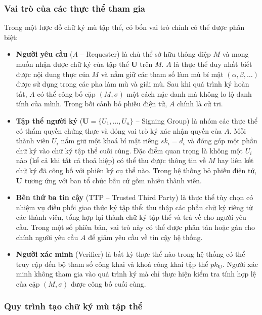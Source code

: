 \subsubsection{Vai trò của các thực thể tham gia}

Trong một lược đồ chữ ký mù tập thể, có bốn vai trò chính có thể được phân biệt:

\begin{itemize}
    \item \textbf{Người yêu cầu} ($A$ -- Requester) là chủ thể sở hữu thông điệp $M$ và mong muốn nhận được chữ ký của tập thể $\mathbf{U}$ trên $M$. $A$ là thực thể duy nhất biết được nội dung thực của $M$ và nắm giữ các tham số làm mù bí mật $(\alpha, \beta, \ldots)$ được sử dụng trong các pha làm mù và giải mù. Sau khi quá trình ký hoàn tất, $A$ có thể công bố cặp $(M, \sigma)$ một cách nặc danh mà không lo lộ danh tính của mình. Trong bối cảnh bỏ phiếu điện tử, $A$ chính là cử tri.

    \item \textbf{Tập thể người ký} ($\mathbf{U} = \{U_1, \ldots, U_n\}$ -- Signing Group) là nhóm các thực thể có thẩm quyền chứng thực và đóng vai trò ký xác nhận quyền của $A$. Mỗi thành viên $U_i$ nắm giữ một khoá bí mật riêng $sk_i = d_i$ và đóng góp một phần chữ ký vào chữ ký tập thể cuối cùng. Đặc điểm quan trọng là không một $U_i$ nào (kể cả khi tất cả thoả hiệp) có thể thu được thông tin về $M$ hay liên kết chữ ký đã công bố với phiên ký cụ thể nào. Trong hệ thống bỏ phiếu điện tử, $\mathbf{U}$ tương ứng với ban tổ chức bầu cử gồm nhiều thành viên.

    \item \textbf{Bên thứ ba tin cậy} (TTP -- Trusted Third Party) là thực thể tùy chọn có nhiệm vụ điều phối giao thức ký tập thể: thu thập các phần chữ ký riêng từ các thành viên, tổng hợp lại thành chữ ký tập thể và trả về cho người yêu cầu. Trong một số phiên bản, vai trò này có thể được phân tán hoặc gán cho chính người yêu cầu $A$ để giảm yêu cầu về tin cậy hệ thống.

    \item \textbf{Người xác minh} (Verifier) là bất kỳ thực thể nào trong hệ thống có thể truy cập đến bộ tham số công khai và khoá công khai tập thể $pk_{\mathbf{U}}$. Người xác minh không tham gia vào quá trình ký mà chỉ thực hiện kiểm tra tính hợp lệ của cặp $(M, \sigma)$ được công bố cuối cùng.
\end{itemize}

\subsubsection{Quy trình tạo chữ ký mù tập thể}

